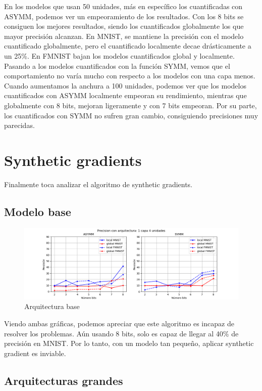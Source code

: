 En los modelos que usan 50 unidades, más en específico los cuantificadas con ASYMM, podemos ver un empeoramiento de los resultados. Con los 8 bits se consiguen los mejores resultados, siendo los cuantificados globalmente los que mayor precisión alcanzan. En MNIST, se mantiene la precisión con el modelo cuantificado globalmente, pero el cuantificado localmente decae drásticamente a un 25\%. En FMNIST bajan los modelos cuantificados global y localmente. Pasando a los modelos cuantificados con la función SYMM, vemos que el comportamiento no varía mucho con respecto a los modelos con una capa menos. Cuando aumentamos la anchura a 100 unidades, podemos ver que los modelos cuantificados con ASYMM localmente empeoran su rendimiento, mientras que globalmente con 8 bits, mejoran ligeramente y con 7 bits empeoran. Por su parte, los cuantificados con SYMM no sufren gran cambio, consiguiendo precisiones muy parecidas.


\section{Synthetic gradients} \label{synthetic gradient}
Finalmente toca analizar el algoritmo de synthetic gradients.
\subsection{Modelo base}
\begin{figure}[H]
    \centering
    \includegraphics[width=\textwidth]{imagenes/dni/Precision con arquitectura: 1 capa 4 unidades.png}
    \caption{Arquitectura base}
\end{figure}

Viendo ambas gráficas, podemos apreciar que este algoritmo es incapaz de resolver los problemas. Aún usando 8 bits, solo es capaz de llegar al 40\% de precisión en MNIST. Por lo tanto, con un modelo tan pequeño, aplicar synthetic gradient es inviable.


\subsection{Arquitecturas grandes}

